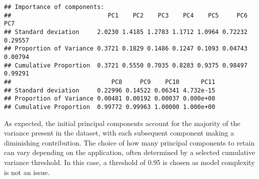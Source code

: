 \documentclass[
]{article}
\newenvironment{Shaded}{\begin{snugshade}}{\end{snugshade}}
\newcommand{\AttributeTok}[1]{\textcolor[rgb]{0.13,0.29,0.53}{#1}}
\newcommand{\ConstantTok}[1]{\textcolor[rgb]{0.56,0.35,0.01}{#1}}
\newcommand{\FunctionTok}[1]{\textcolor[rgb]{0.13,0.29,0.53}{\textbf{#1}}}
\newcommand{\NormalTok}[1]{#1}
\newcommand{\OtherTok}[1]{\textcolor[rgb]{0.56,0.35,0.01}{#1}}
\newcommand{\SpecialCharTok}[1]{\textcolor[rgb]{0.81,0.36,0.00}{\textbf{#1}}}
\begin{document}
\begin{Shaded}
\end{Shaded}

\begin{verbatim}
## Importance of components:
##                           PC1    PC2    PC3    PC4    PC5     PC6     PC7
## Standard deviation     2.0230 1.4185 1.2783 1.1712 1.0964 0.72232 0.29557
## Proportion of Variance 0.3721 0.1829 0.1486 0.1247 0.1093 0.04743 0.00794
## Cumulative Proportion  0.3721 0.5550 0.7035 0.8283 0.9375 0.98497 0.99291
##                            PC8     PC9    PC10      PC11
## Standard deviation     0.22996 0.14522 0.06341 4.732e-15
## Proportion of Variance 0.00481 0.00192 0.00037 0.000e+00
## Cumulative Proportion  0.99772 0.99963 1.00000 1.000e+00
\end{verbatim}

As expected, the initial principal components account for the majority
of the variance present in the dataset, with each subsequent component
making a diminishing contribution. The choice of how many principal
components to retain can vary depending on the application, often
determined by a selected cumulative variance threshold. In this case, a
threshold of 0.95 is chosen as model complexity is not an issue.
\end{document}

